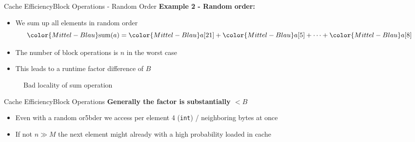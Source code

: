 \begin{frame}{Cache Efficiency}{Block Operations - Random Order}
  \textbf{Example 2 - Random order:}
  \begin{itemize}
    \item<2->
      We sum up all elements in {\color{Mittel-Blau}random order}
      \begin{displaymath}
        {\color{Mittel-Blau}\mathrm{sum}(a)} =
        {\color{Mittel-Blau}a[21]} +
        {\color{Mittel-Blau}a[5]} +
        \dots +
        {\color{Mittel-Blau}a[8]}
      \end{displaymath}
    \item<3->
      The number of block operations is {\color{Mittel-Blau}$n$} in the
      {\color{Mittel-Blau}worst case}
    \item<4->
      This leads to a runtime factor difference of {\color{Mittel-Blau}$B$}
  \end{itemize}
   \vspace{-1.0em}
  \begin{figure}%
    \begin{adjustbox}{width=\linewidth}%
    \end{adjustbox}%
    \caption{Bad locality of sum operation}
    \label{fig:caching:memory_locality_random}
  \end{figure}%
  \vspace{-1.0em}
\end{frame}


\begin{frame}{Cache Efficiency}{Block Operations}
  \textbf{Generally the factor is substantially {\color{Mittel-Blau}$< B$}}
  \begin{itemize}
    \item<2->
      Even with a {\color{Mittel-Blau}random or5bder} we access per element 4 (\texttt{int}) /
      neighboring bytes at once
    \item<3->
      If {\color{Mittel-Blau}not $n \gg M$} the next element might already
      with a high probability loaded in cache
  \end{itemize}
\end{frame}


